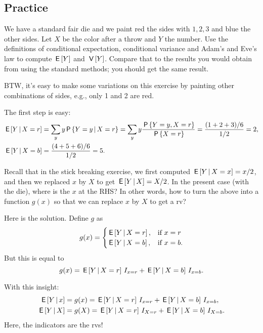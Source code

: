 \subsection{Practice}
\label{sec:practice}




\begin{exercise}
We have a standard fair die and we paint red the sides with $1, 2, 3$ and blue the other sides.
Let $X$ be the color after a throw and $Y$ the number.
Use the definitions of conditional expectation, conditional variance and Adam's and Eve's law to compute $\,\mathsf{E}\left[Y\right]$ and $\,\mathsf{V}\left[Y\right]$.
Compare that to the results you would obtain from using the standard methods; you should get the same result.


BTW, it's easy to make some variations on this exercise by painting other combinations of sides, e.g., only 1 and 2 are red.
\begin{solution}
The first step is easy:
\begin{align}
\,\mathsf{E}\left[Y\,\middle|\, X=r\right] &= \sum_{y} y \,\mathsf{P}\left\{Y=y\,\middle|\, X=r\right\} = \sum_{y} y \frac{\,\mathsf{P}\left\{Y=y,  X=r\right\}}{\,\mathsf{P}\left\{X=r\right\}} = \frac{(1+2+3)/6}{1/2}  = 2, \\
\,\mathsf{E}\left[Y\,\middle|\, X=b\right] &= \frac{(4 + 5+ 6)/6}{1/2}  = 5.
\end{align}

Recall that in the stick breaking exercise, we first computed $\,\mathsf{E}\left[Y\,\middle|\, X = x\right] = x/2$, and then we replaced $x$ by $X$ to get $\,\mathsf{E}\left[Y\,\middle|\, X\right] = X/2$. In the present case (with the die), where is the $x$ at the RHS? In other words, how to turn the above into a function $g(x)$ so that we can replace $x$ by $X$ to get a rv?


Here is the solution. Define $g$ as
\begin{equation}
  \label{eq:111}
  g(x) =
  \begin{cases}
    \,\mathsf{E}\left[Y\,\middle|\, X=r\right], & \text{if } x = r \\
    \,\mathsf{E}\left[Y\,\middle|\, X=b\right], & \text{if } x = b.
  \end{cases}
\end{equation}
But this is equal to
\begin{equation}
  \label{eq:112}
  g(x) = \,\mathsf{E}\left[Y\,\middle|\, X=r\right] \,I_{x=r} + \,\mathsf{E}\left[Y\,\middle|\, X=b\right] \,I_{x=b}.
\end{equation}

With this insight:
\begin{align*}
\,\mathsf{E}\left[Y\,\middle|\, x\right] &=  g(x) = \,\mathsf{E}\left[Y\,\middle|\, X=r\right] \,I_{x=r} + \,\mathsf{E}\left[Y\,\middle|\, X=b\right] \,I_{x=b}, \\
\,\mathsf{E}\left[Y\,\middle|\, X\right] &=  g(X) = \,\mathsf{E}\left[Y\,\middle|\, X=r\right] \,I_{X=r} + \,\mathsf{E}\left[Y\,\middle|\, X=b\right] \,I_{X=b}.
\end{align*}
Here, the indicators are the rvs!


\end{solution}
\end{exercise}
